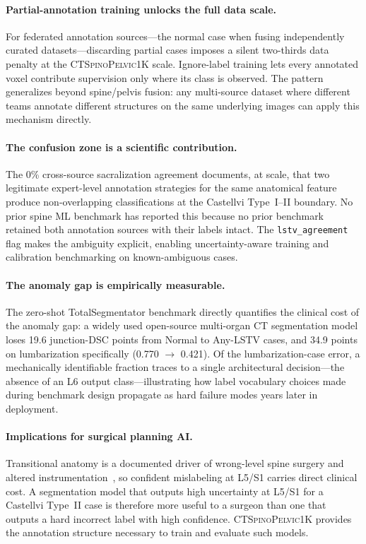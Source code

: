 \documentclass[pmlr]{jmlr}
\newcommand{\dataset}{\textsc{CTSpinoPelvic1K}}
\begin{document}
\paragraph{Partial-annotation training unlocks the full data scale.}
For federated annotation sources---the normal case when fusing
independently curated datasets---discarding partial cases imposes a
silent two-thirds data penalty at the \dataset{} scale.
Ignore-label training lets every annotated voxel contribute
supervision only where its class is observed.
The pattern generalizes beyond spine/pelvis fusion: any multi-source
dataset where different teams annotate different structures on the
same underlying images can apply this mechanism directly.

\paragraph{The confusion zone is a scientific contribution.}
The 0\% cross-source sacralization agreement documents, at scale,
that two legitimate expert-level annotation strategies for the same
anatomical feature produce non-overlapping classifications at the
Castellvi Type~I--II boundary.
No prior spine ML benchmark has reported this because no prior
benchmark retained both annotation sources with their labels intact.
The \texttt{lstv\_agreement} flag makes the ambiguity explicit,
enabling uncertainty-aware training and calibration benchmarking
on known-ambiguous cases.

\paragraph{The anomaly gap is empirically measurable.}
The zero-shot TotalSegmentator benchmark directly quantifies the
clinical cost of the anomaly gap: a widely used open-source
multi-organ CT segmentation model loses 19.6 junction-DSC points
from Normal to Any-LSTV cases, and 34.9 points on lumbarization
specifically (0.770 $\rightarrow$ 0.421).
Of the lumbarization-case error, a mechanically identifiable
fraction traces to a single architectural decision---the absence of
an L6 output class---illustrating how label vocabulary choices made
during benchmark design propagate as hard failure modes years
later in deployment.

\paragraph{Implications for surgical planning AI.}
Transitional anatomy is a documented driver of wrong-level spine
surgery and altered
instrumentation~\citep{Konin2010LumbosacralRelevance,Carrino2011EffectImaging},
so confident mislabeling at L5/S1 carries direct clinical cost.
A segmentation model that outputs high uncertainty at L5/S1 for a
Castellvi Type~II case is therefore more useful to a surgeon than one
that outputs a hard incorrect label with high confidence.
\dataset{} provides the annotation structure necessary to train
and evaluate such models.
\end{document}
